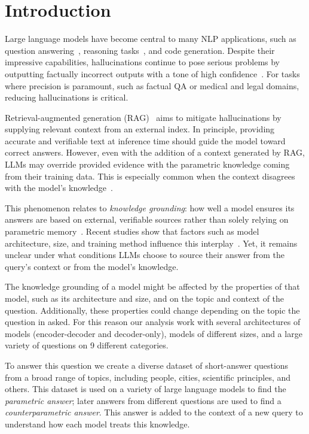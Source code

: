 \section{Introduction}

Large language models have become central to many NLP applications, such as question answering~\cite{gpt3,how_can_we_know}, reasoning tasks~\cite{treeofthoughts}, and code generation\cite{alphacode_generation}.
Despite their impressive capabilities, hallucinations continue to pose serious problems by outputting factually incorrect outputs with a tone of high confidence~\cite{how_can_we_know}.
For tasks where precision is paramount, such as factual QA or medical and legal domains, reducing hallucinations is critical\cite{mitigating_hallucinations}.

Retrieval-augmented generation (RAG)~\cite{rag} aims to mitigate hallucinations by supplying relevant context from an external index.
In principle, providing accurate and verifiable text at inference time should guide the model toward correct answers.
However, even with the addition of a context generated by RAG, LLMs may override provided evidence with the parametric knowledge coming from their training data.
This is especially common when the context disagrees with the model's knowledge~\cite{factual_recall,ragged}.

This phenomenon relates to \emph{knowledge grounding}: how well a model ensures its answers are based on external, verifiable sources rather than solely relying on parametric memory~\cite{rag}.
Recent studies show that factors such as model architecture, size, and training method influence this interplay~\cite{factual_recall,flant5,llama}.
Yet, it remains unclear under what conditions LLMs choose to source their answer from the query's context or from the model's knowledge.

The knowledge grounding of a model might be affected by the properties of that model, such as its architecture and size, and on the topic and context of the question.
Additionally, these properties could change depending on the topic the question in asked.
For this reason our analysis work with several architectures of models (encoder-decoder and decoder-only), models of different sizes, and a large variety of questions on 9 different categories.

To answer this question we create a diverse dataset of short-answer questions from a broad range of topics, including people, cities, scientific principles, and others.
This dataset is used on a variety of large language models to find the \emph{parametric answer}; later answers from different questions are used to find a \emph{counterparametric answer}.
This answer is added to the context of a new query to understand how each model treats this knowledge.


